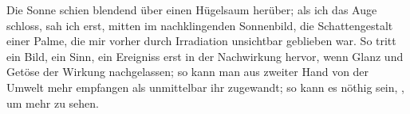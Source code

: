Die Sonne schien blendend über einen Hügelsaum herüber; als ich das Auge schloss, sah ich erst, mitten im nachklingenden Sonnenbild, die Schattengestalt einer Palme, die mir vorher durch Irradiation unsichtbar geblieben war. So tritt ein Bild, ein Sinn, ein Ereigniss erst in der Nachwirkung hervor, wenn Glanz und Getöse der Wirkung nachgelassen; so kann man aus zweiter Hand von der Umwelt mehr empfangen als unmittelbar ihr zugewandt; so kann es nöthig sein, , um mehr zu sehen.
\par

